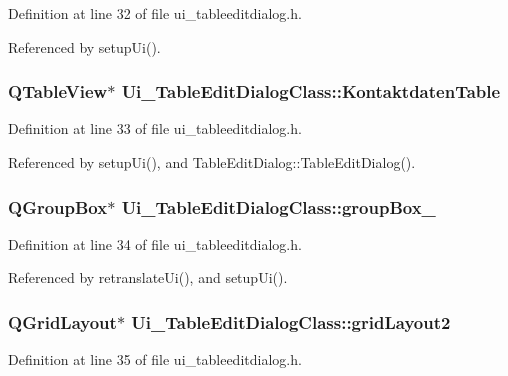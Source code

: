 Definition at line 32 of file ui\_\-tableeditdialog.h.

Referenced by setupUi().\hypertarget{class_ui___table_edit_dialog_class_7127dc0106c562fc097ca9be9ba55b03}{
\subsubsection[KontaktdatenTable]{\setlength{\rightskip}{0pt plus 5cm}QTableView$\ast$ {\bf Ui\_\-TableEditDialogClass::KontaktdatenTable}}}
\label{class_ui___table_edit_dialog_class_7127dc0106c562fc097ca9be9ba55b03}




Definition at line 33 of file ui\_\-tableeditdialog.h.

Referenced by setupUi(), and TableEditDialog::TableEditDialog().\hypertarget{class_ui___table_edit_dialog_class_49d6ba9f4ecdd0db27c421a442ab2648}{
\subsubsection[groupBox\_\-2]{\setlength{\rightskip}{0pt plus 5cm}QGroupBox$\ast$ {\bf Ui\_\-TableEditDialogClass::groupBox\_}}}
\label{class_ui___table_edit_dialog_class_49d6ba9f4ecdd0db27c421a442ab2648}




Definition at line 34 of file ui\_\-tableeditdialog.h.

Referenced by retranslateUi(), and setupUi().\hypertarget{class_ui___table_edit_dialog_class_05d9b832d1b595f32791290777119c15}{
\subsubsection[gridLayout2]{\setlength{\rightskip}{0pt plus 5cm}QGridLayout$\ast$ {\bf Ui\_\-TableEditDialogClass::gridLayout2}}}
\label{class_ui___table_edit_dialog_class_05d9b832d1b595f32791290777119c15}




Definition at line 35 of file ui\_\-tableeditdialog.h.

